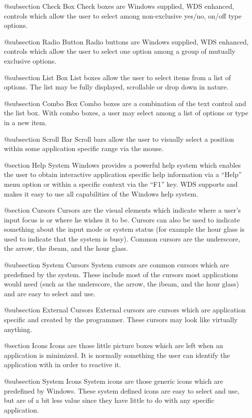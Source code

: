 @subsection Check Box
Check boxes are Windows supplied, WDS enhanced, controls which allow
the user to select among non-exclusive yes/no, on/off type options.

@subsection Radio Button
Radio buttons are Windows supplied, WDS enhanced, controls which allow
the user to select one option among a group of mutually exclusive options.

@subsection List Box
List boxes allow the user to select items from a list of options.  The
list may be fully displayed, scrollable or drop down in nature.

@subsection Combo Box
Combo boxes are a combination of the text control and the list box.
With combo boxes, a user may select among a list of options or type
in a new item.

@subsection Scroll Bar
Scroll bars allow the user to visually select a position within some
application specific range via the mouse.

@section Help System
Windows provides a powerful help system which enables the user to obtain
interactive application specific help information via a ``Help'' menu
option or within a specific context via the ``F1'' key.  WDS supports
and makes it easy to use all capabilities of the Windows help system.

@section Cursors
Cursors are the visual elements which indicate where a user's input focus
is or where he wishes it to be.  Cursors can also be used to indicate
something about the input mode or system status (for example the hour
glass is used to indicate that the system is busy).  Common cursors are
the underscore, the arrow, the ibeam, and the hour glass.

@subsection System Cursors
System cursors are common cursors which are predefined by the system.
These include most of the cursors most applications would need (such as
the underscore, the arrow, the ibeam, and the hour glass) and are easy to
select and use.

@subsection External Cursors
External cursors are cursors which are application specific and
created by the programmer.  These cursors may look like virtually
anything.

@section Icons
Icons are those little picture boxes which are left when an application
is minimized.  It is normally something the user can identify the
application with in order to reactive it.

@subsection System Icons
System icons are those generic icons which are predefined by Windows.
These system defined icons are easy to select and use, but are of a bit
less value since they have little to do with any specific application.

